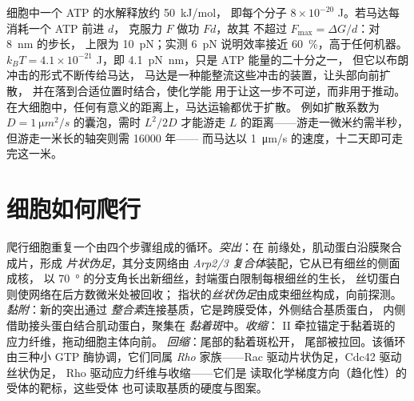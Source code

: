 \begin{proposition}[马达何以可能]\label{prop:b3:cytoskeleton-motility:physics}
细胞中一个 ATP 的水解释放约 \qty{50}{kJ/mol}，
即每个分子 $8\times 10^{-20}$ J。若马达每消耗一个 ATP 前进 $d$，
克服力 $F$ 做功 $Fd$，故其\emph{}
不超过 $F_{\max} = \Delta G/d$：对 \qty{8}{nm} 的步长，
上限为 \qty{10}{pN}；实测 \qty{6}{pN} 说明效率接近
\qty{60}{\%}，高于任何机器。 $k_{B}T =
4.1\times 10^{-21}$ J，即 \qty{4.1}{pN.nm}，只是 ATP 能量的二十分之一，
但它以布朗冲击的形式不断传给马达，
马达是一种能整流这些冲击的装置，让头部向前扩散，
并在落到合适位置时结合，使化学能
用于让这一步不可逆，而非用于推动。
在大细胞中，任何有意义的距离上，马达运输都优于扩散。
例如扩散系数为 $D = \qty{1}{\micro
m^2/s}$ 的囊泡，需时 $L^{2}/2D$ 才能游走 $L$ 的距离——游走一微米约需半秒，
但游走一米长的轴突则需 \num{16000} 年——
而马达以 \qty{1}{\micro m/s} 的速度，十二天即可走完这一米。
\end{proposition}
\admitted

\section{细胞如何爬行}

\begin{definition}[细胞迁移]\label{def:b3:cytoskeleton-motility:migration}
爬行细胞重复一个由四个步骤组成的循环。\emph{突出}：在
前缘处，肌动蛋白沿膜聚合成片，形成
\emph{片状伪足}，其分支网络由
\emph{Arp2/3 复合体}装配，它从已有细丝的侧面成核，
以 \qty{70}{\degree} 的分支角长出新细丝，封端蛋白限制每根细丝的生长，
丝切蛋白则使网络在后方数微米处被回收；
指状的\emph{丝状伪足}由成束细丝构成，向前探测。
\emph{黏附}：新的突出通过
\emph{整合素}连接基质，它是跨膜受体，外侧结合基质蛋白，
内侧借助接头蛋白结合肌动蛋白，聚集在
\emph{黏着斑}中。\emph{收缩}： II 牵拉锚定于黏着斑的
应力纤维，拖动细胞主体向前。
\emph{回缩}：尾部的黏着斑松开，
尾部被拉回。该循环由三种小 GTP 酶协调，它们同属
\emph{Rho} 家族——Rac 驱动片状伪足，Cdc42 驱动丝状伪足，
Rho 驱动应力纤维与收缩——它们是
读取化学梯度方向（趋化性）的受体的靶标，这些受体
也可读取基质的硬度与图案。
\end{definition}


